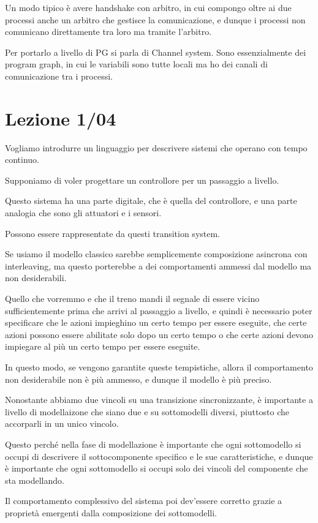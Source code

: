Un modo tipico è avere handshake con arbitro, in cui compongo oltre ai due processi anche un arbitro che gestisce la comunicazione, e dunque i processi non comunicano direttamente tra loro ma tramite l'arbitro.

Per portarlo a livello di PG si parla di Channel system. Sono essenzialmente dei program graph, in cui le variabili sono tutte locali ma ho dei canali di comunicazione tra i processi.

\chapter{Lezione 1/04}

Vogliamo introdurre un linguaggio per descrivere sistemi che operano con tempo continuo.

Supponiamo di voler progettare un controllore per un passaggio a livello.

Questo sistema ha una parte digitale, che è quella del controllore, e una parte analogia che sono gli attuatori e i sensori.

Possono essere rappresentate da questi transition system.

Se usiamo il modello classico sarebbe semplicemente composizione asincrona con interleaving, ma questo porterebbe a dei comportamenti ammessi dal modello ma non desiderabili.


Quello che vorremmo e che il treno mandi il segnale di essere vicino sufficientemente prima che arrivi al passaggio a livello, e quindi è necessario poter specificare che le azioni impieghino un certo tempo per essere eseguite, che certe azioni possono essere abilitate solo dopo un certo tempo o che certe azioni devono impiegare al più un certo tempo per essere eseguite.


In questo modo, se vengono garantite queste tempistiche, allora il comportamento non desiderabile non è più ammesso, e dunque il modello è più preciso.


\begin{note}{}
  Nonostante abbiamo due vincoli su una transizione sincronizzante, è importante a livello di modellaizone che siano due e su sottomodelli diversi, piuttosto che accorparli in un unico vincolo.

  Questo perché nella fase di modellazione è importante che ogni sottomodello si occupi di descrivere il sottocomponente specifico e le sue caratteristiche, e dunque è importante che ogni sottomodello si occupi solo dei vincoli del componente che sta modellando.

  Il comportamento complessivo del sistema poi dev'essere corretto grazie a proprietà emergenti dalla composizione dei sottomodelli.
\end{note}

